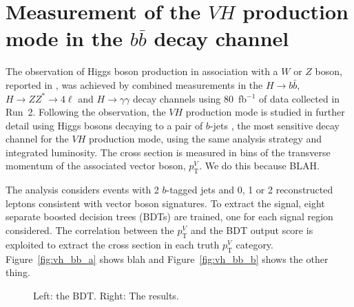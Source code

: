\documentclass{moriond}
\begin{document}
\section{Measurement of the $VH$ production mode in the $b\bar b$ decay channel}\label{sec:vh_bb}

The observation of Higgs boson production in association with a $W$ or $Z$ boson, reported in
\cite{HIGG-2018-04}, was achieved by combined measurements in the $H{\rightarrow}b\bar b$,
$H{\rightarrow}ZZ^*{\rightarrow}4\ell$ and $H{\rightarrow}\gamma\gamma$ decay channels using
80~fb$^{-1}$ of data collected in Run~2.
Following the observation, the $VH$ production mode is studied in further detail using Higgs bosons
decaying to a pair of $b$-jets \cite{HIGG-2018-50}, the most sensitive decay channel for the $VH$ production mode,
using the same analysis strategy and integrated luminosity.
The cross section is measured in bins of the transverse momentum of the associated vector boson,
$p^{V}_\mathrm{T}$. We do this because BLAH.

The analysis considers events with 2 $b$-tagged jets and 0, 1 or 2 reconstructed leptons consistent
with vector boson signatures. To extract the signal, eight separate boosted decision trees (BDTs)
are trained, one for each signal region considered.
The correlation between the $p^{V}_\mathrm{T}$ and the BDT output score is exploited
to extract the cross section in each truth $p^{V}_\mathrm{T}$ category.
Figure~\ref{fig:vh_bb_a} shows blah and Figure~\ref{fig:vh_bb_b} shows the other thing.

\begin{figure}[!htbp]
  \centering
  \caption{
    Left: the BDT. Right: The results.
  }
  \label{fig:vh_bb}
\end{figure}
\end{document}
